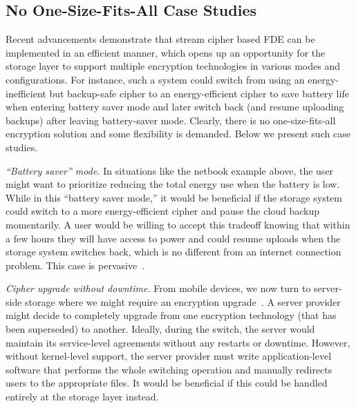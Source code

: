 \subsection{No One-Size-Fits-All Case Studies}

Recent advancements demonstrate that stream cipher based FDE can be implemented
in an efficient manner, which opens up an opportunity for the storage layer to
support multiple encryption technologies in various modes and configurations.
For instance, such a system could switch from using an energy-inefficient but
backup-safe cipher to an energy-efficient cipher to save battery life when
entering battery saver mode and later switch back (and resume uploading backups)
after leaving battery-saver mode. Clearly, there is no one-size-fits-all
encryption solution and some flexibility is demanded. Below we present \numCases
such case studies.

{\em ``Battery saver'' mode.} In situations like the netbook example above, the
user might want to prioritize reducing the total energy use when the battery is
low. While in this ``battery saver mode,'' it would be beneficial if the storage
system could switch to a more energy-efficient cipher and pause the cloud backup
momentarily. A user would be willing to accept this tradeoff knowing that within
a few hours they will have access to power and could resume uploads when the
storage system switches back, which is no different from an internet connection
problem. This case is pervasive~\cite{battery-saver1, battery-saver2,
battery-saver3, battery-saver4, battery-saver5}.

{\em Cipher upgrade without downtime.} From mobile devices, we now turn to
server-side storage where we might require an encryption
upgrade~\cite{upgrade-encryption1,upgrade-encryption2,upgrade-encryption3}. A
server provider might decide to completely upgrade from one encryption
technology (\eg that has been superseded) to another. Ideally, during the
switch, the server would maintain its service-level agreements without any
restarts or downtime. However, without kernel-level support, the server provider
must write application-level software that performs the whole switching
operation and manually redirects users to the appropriate files. It would be
beneficial if this could be handled entirely at the storage layer instead.

